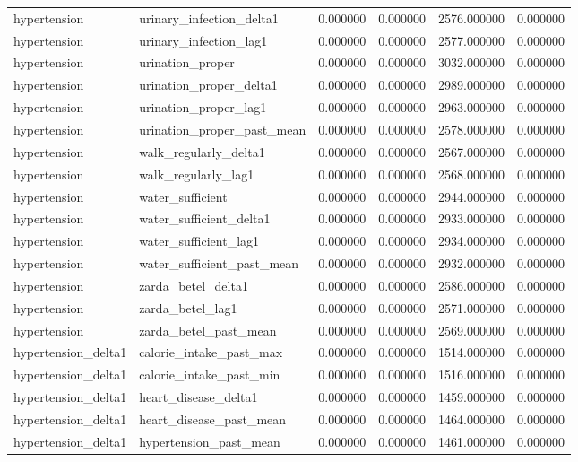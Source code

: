 \begin{longtable}{llrrrr}
hypertension & urinary\_infection\_delta1 & 0.000000 & 0.000000 & 2576.000000 & 0.000000 \\
hypertension & urinary\_infection\_lag1 & 0.000000 & 0.000000 & 2577.000000 & 0.000000 \\
hypertension & urination\_proper & 0.000000 & 0.000000 & 3032.000000 & 0.000000 \\
hypertension & urination\_proper\_delta1 & 0.000000 & 0.000000 & 2989.000000 & 0.000000 \\
hypertension & urination\_proper\_lag1 & 0.000000 & 0.000000 & 2963.000000 & 0.000000 \\
hypertension & urination\_proper\_past\_mean & 0.000000 & 0.000000 & 2578.000000 & 0.000000 \\
hypertension & walk\_regularly\_delta1 & 0.000000 & 0.000000 & 2567.000000 & 0.000000 \\
hypertension & walk\_regularly\_lag1 & 0.000000 & 0.000000 & 2568.000000 & 0.000000 \\
hypertension & water\_sufficient & 0.000000 & 0.000000 & 2944.000000 & 0.000000 \\
hypertension & water\_sufficient\_delta1 & 0.000000 & 0.000000 & 2933.000000 & 0.000000 \\
hypertension & water\_sufficient\_lag1 & 0.000000 & 0.000000 & 2934.000000 & 0.000000 \\
hypertension & water\_sufficient\_past\_mean & 0.000000 & 0.000000 & 2932.000000 & 0.000000 \\
hypertension & zarda\_betel\_delta1 & 0.000000 & 0.000000 & 2586.000000 & 0.000000 \\
hypertension & zarda\_betel\_lag1 & 0.000000 & 0.000000 & 2571.000000 & 0.000000 \\
hypertension & zarda\_betel\_past\_mean & 0.000000 & 0.000000 & 2569.000000 & 0.000000 \\
hypertension\_delta1 & calorie\_intake\_past\_max & 0.000000 & 0.000000 & 1514.000000 & 0.000000 \\
hypertension\_delta1 & calorie\_intake\_past\_min & 0.000000 & 0.000000 & 1516.000000 & 0.000000 \\
hypertension\_delta1 & heart\_disease\_delta1 & 0.000000 & 0.000000 & 1459.000000 & 0.000000 \\
hypertension\_delta1 & heart\_disease\_past\_mean & 0.000000 & 0.000000 & 1464.000000 & 0.000000 \\
hypertension\_delta1 & hypertension\_past\_mean & 0.000000 & 0.000000 & 1461.000000 & 0.000000 \\

\end{longtable}
